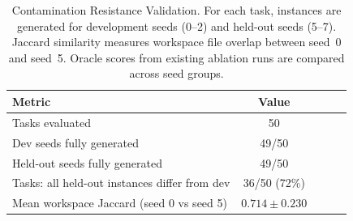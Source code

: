 \begin{table}[htbp]
\centering
\caption{Contamination Resistance Validation. For each task, instances are generated for development seeds (0--2) and held-out seeds (5--7). Jaccard similarity measures workspace file overlap between seed~0 and seed~5. Oracle scores from existing ablation runs are compared across seed groups.}
\label{tab:contamination}
\small
\begin{tabular}{lcccc}
\toprule
Metric & Value \\
\midrule
Tasks evaluated & 50 \\
Dev seeds fully generated & 49/50 \\
Held-out seeds fully generated & 49/50 \\
Tasks: all held-out instances differ from dev & 36/50 (72\%) \\
Mean workspace Jaccard (seed 0 vs seed 5) & $0.714 \pm 0.230$ \\
\bottomrule
\end{tabular}
\end{table}
